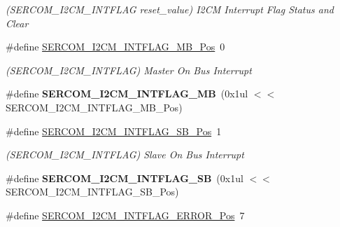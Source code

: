 \begin{DoxyCompactItemize}
\begin{DoxyCompactList}\small\item\em (S\+E\+R\+C\+O\+M\+\_\+\+I2\+C\+M\+\_\+\+I\+N\+T\+F\+L\+A\+G reset\+\_\+value) I2\+C\+M Interrupt Flag Status and Clear \end{DoxyCompactList}\item 
\hypertarget{group___s_a_m_l21___s_e_r_c_o_m_ga4ad2a02b2f48107fb984dc5cd3cae720}{}\#define \hyperlink{group___s_a_m_l21___s_e_r_c_o_m_ga4ad2a02b2f48107fb984dc5cd3cae720}{S\+E\+R\+C\+O\+M\+\_\+\+I2\+C\+M\+\_\+\+I\+N\+T\+F\+L\+A\+G\+\_\+\+M\+B\+\_\+\+Pos}~0\label{group___s_a_m_l21___s_e_r_c_o_m_ga4ad2a02b2f48107fb984dc5cd3cae720}

\begin{DoxyCompactList}\small\item\em (S\+E\+R\+C\+O\+M\+\_\+\+I2\+C\+M\+\_\+\+I\+N\+T\+F\+L\+A\+G) Master On Bus Interrupt \end{DoxyCompactList}\item 
\hypertarget{group___s_a_m_l21___s_e_r_c_o_m_ga012e18560aaf51e713b53a06551896a5}{}\#define {\bfseries S\+E\+R\+C\+O\+M\+\_\+\+I2\+C\+M\+\_\+\+I\+N\+T\+F\+L\+A\+G\+\_\+\+M\+B}~(0x1ul $<$$<$ S\+E\+R\+C\+O\+M\+\_\+\+I2\+C\+M\+\_\+\+I\+N\+T\+F\+L\+A\+G\+\_\+\+M\+B\+\_\+\+Pos)\label{group___s_a_m_l21___s_e_r_c_o_m_ga012e18560aaf51e713b53a06551896a5}

\item 
\hypertarget{group___s_a_m_l21___s_e_r_c_o_m_gaf2d04517d78a90cc6ff8775bdc44f7bb}{}\#define \hyperlink{group___s_a_m_l21___s_e_r_c_o_m_gaf2d04517d78a90cc6ff8775bdc44f7bb}{S\+E\+R\+C\+O\+M\+\_\+\+I2\+C\+M\+\_\+\+I\+N\+T\+F\+L\+A\+G\+\_\+\+S\+B\+\_\+\+Pos}~1\label{group___s_a_m_l21___s_e_r_c_o_m_gaf2d04517d78a90cc6ff8775bdc44f7bb}

\begin{DoxyCompactList}\small\item\em (S\+E\+R\+C\+O\+M\+\_\+\+I2\+C\+M\+\_\+\+I\+N\+T\+F\+L\+A\+G) Slave On Bus Interrupt \end{DoxyCompactList}\item 
\hypertarget{group___s_a_m_l21___s_e_r_c_o_m_gac677d8d8c646476340f115aa51ab69a2}{}\#define {\bfseries S\+E\+R\+C\+O\+M\+\_\+\+I2\+C\+M\+\_\+\+I\+N\+T\+F\+L\+A\+G\+\_\+\+S\+B}~(0x1ul $<$$<$ S\+E\+R\+C\+O\+M\+\_\+\+I2\+C\+M\+\_\+\+I\+N\+T\+F\+L\+A\+G\+\_\+\+S\+B\+\_\+\+Pos)\label{group___s_a_m_l21___s_e_r_c_o_m_gac677d8d8c646476340f115aa51ab69a2}

\item 
\hypertarget{group___s_a_m_l21___s_e_r_c_o_m_gaa0ccc83aa2c9d24416313db3423634ed}{}\#define \hyperlink{group___s_a_m_l21___s_e_r_c_o_m_gaa0ccc83aa2c9d24416313db3423634ed}{S\+E\+R\+C\+O\+M\+\_\+\+I2\+C\+M\+\_\+\+I\+N\+T\+F\+L\+A\+G\+\_\+\+E\+R\+R\+O\+R\+\_\+\+Pos}~7\label{group___s_a_m_l21___s_e_r_c_o_m_gaa0ccc83aa2c9d24416313db3423634ed}


\end{DoxyCompactItemize}
